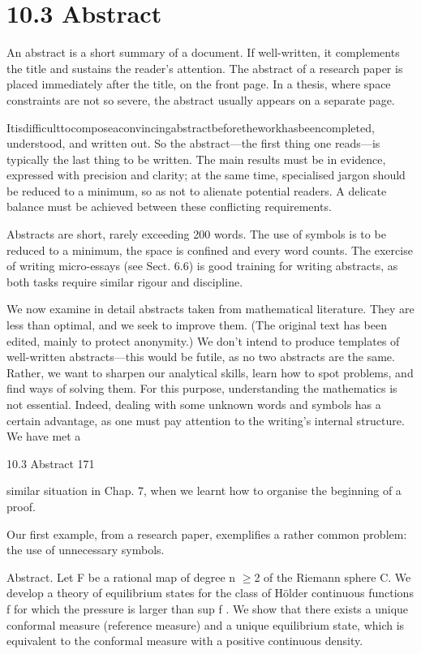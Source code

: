 \documentclass[11pt]{article}
\theoremstyle{plain}
\theoremstyle{definition}
\begin{document}
\section{10.3 Abstract}

An abstract is a short summary of a document. If well-written, it complements the title and sustains the reader's attention. The abstract of a research paper is placed immediately after the title, on the front page. In a thesis, where space constraints are not so severe, the abstract usually appears on a separate page.

Itisdifficulttocomposeaconvincingabstractbeforetheworkhasbeencompleted, understood, and written out. So the abstract---the first thing one reads---is typically the last thing to be written. The main results must be in evidence, expressed with precision and clarity; at the same time, specialised jargon should be reduced to a minimum, so as not to alienate potential readers. A delicate balance must be achieved between these conflicting requirements.

Abstracts are short, rarely exceeding 200 words. The use of symbols is to be reduced to a minimum, the space is confined and every word counts. The exercise of writing micro-essays (see Sect. 6.6) is good training for writing abstracts, as both tasks require similar rigour and discipline.

We now examine in detail abstracts taken from mathematical literature. They are less than optimal, and we seek to improve them. (The original text has been edited, mainly to protect anonymity.) We don't intend to produce templates of well-written abstracts---this would be futile, as no two abstracts are the same. Rather, we want to sharpen our analytical skills, learn how to spot problems, and find ways of solving them. For this purpose, understanding the mathematics is not essential. Indeed, dealing with some unknown words and symbols has a certain advantage, as one must pay attention to the writing's internal structure. We have met a

10.3 Abstract 171

similar situation in Chap. 7, when we learnt how to organise the beginning of a proof.

Our first example, from a research paper, exemplifies a rather common problem: the use of unnecessary symbols.

Abstract. Let F be a rational map of degree n $\geq$2 of the Riemann sphere C. We develop a theory of equilibrium states for the class of Hölder continuous functions f for which the pressure is larger than sup f . We show that there exists a unique conformal measure (reference measure) and a unique equilibrium state, which is equivalent to the conformal measure with a positive continuous density.
\end{document}
